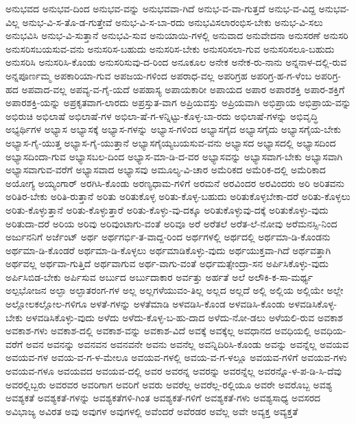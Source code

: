{ಅನುಭವದ
ಅನುಭವ-ದಿಂದ
ಅನುಭವ-ವನ್ನು
ಅನುಭವವಾ-ಗಿದೆ
ಅನುಭ-ವ-ವಾ-ಗುತ್ತದೆ
ಅನುಭ-ವ-ವಿದ್ದ
ಅನುಭವ-ವಿಲ್ಲ
ಅನುಭ-ವಿ-ಸ-ತೊ-ಡ-ಗುತ್ತೇವೆ
ಅನುಭ-ವಿ-ಸ-ಬಾ-ರದು
ಅನುಭವಿಸಲಾರಂಭಿಸ-ಬೇಕು
ಅನುಭ-ವಿ-ಸಲು
ಅನುಭವಿಸಿ
ಅನುಭ-ವಿ-ಸುತ್ತಾನೆ
ಅನುಭವಿ-ಸುವ
ಅನುಯಾಯಿ-ಗಳಲ್ಲಿ
ಅನುವಾದ
ಅನುವೇದನಾ
ಅನುಸರಣೆ
ಅನುಸರಿ
ಅನುಸರಿಸಬಯಸುವ-ವನು
ಅನುಸರಿಸ-ಬಹುದು
ಅನುಸರಿಸ-ಬೇಕು
ಅನುಸರಿಸಲಾ-ಗುವ
ಅನುಸರಿಸಲೂ-ಬಹುದು
ಅನುಸರಿಸಿ
ಅನುಸರಿಸಿ-ಕೊಂಡು
ಅನುಸರಿಸುವು-ದ-ರಿಂದ
ಅನೂಕೂಲ
ಅನೇಕ
ಅನೇಕ-ರು-ನಾನು
ಅನ್ನನಾಳ-ದಲ್ಲಿ-ರುವ
ಅನ್ನಪೂರ್ಣಮ್ಮ
ಅಪಕಾರಿಯಾ-ಗುವ
ಅಪಜಯ-ಗಳಿಂದ
ಅಪರಾಧ-ವಲ್ಲ
ಅಪರಿಗ್ರಹ
ಅಪರಿಗ್ರ-ಹ-ಗ-ಳೆಂಬ
ಅಪರಿಗ್ರ-ಹದ
ಅಪವಾದ-ವಲ್ಲ
ಅಪವ್ಯ-ವ-ಗೈ-ಯದೆ
ಅಪಹಾಸ್ಯ
ಅಪಾಯಕಾರೀ
ಅಪಾಯದ
ಅಪಾರ
ಅಪಾರಶಕ್ತಿ
ಅಪಾರ-ಶಕ್ತಿಗೆ
ಅಪಾರಶಕ್ತಿ-ಯನ್ನು
ಅಪ್ರಕೃತವಾಗ-ಲಾರದು
ಅಪ್ರಸ್ತುತ-ವಾಗ
ಅಪ್ರಿಯವಸ್ತು
ಅಪ್ರಿಯವಾಗಿ
ಅಭಿಪ್ರಾಯ
ಅಭಿಪ್ರಾಯ-ವನ್ನು
ಅಭಿರುಚಿ
ಅಭಿಲಾಷೆ
ಅಭಿಲಾಷೆ-ಗಳ
ಅಭಿಲಾ-ಷೆ-ಗ-ಳನ್ನಿಟ್ಟು-ಕೊಳ್ಳ-ಬಾ-ರದು
ಅಭಿಲಾಷೆ-ಗಳನ್ನು
ಅಭಿವೃದ್ಧಿ
ಅಭ್ಯರ್ಥಿಗಳ
ಅಭ್ಯಾಸ
ಅಭ್ಯಾಸಕ್ಕೆ
ಅಭ್ಯಾಸ-ಗಳನ್ನು
ಅಭ್ಯಾಸ-ಗಳಿಂದ
ಅಭ್ಯಾಸಗೈದ
ಅಭ್ಯಾಸಗೈದು
ಅಭ್ಯಾಸಗೈಯ-ಬೇಕು
ಅಭ್ಯಾಸ-ಗೈ-ಯುತ್ತ
ಅಭ್ಯಾಸ-ಗೈ-ಯುತ್ತಾನೆ
ಅಭ್ಯಾಸಗೈಯ್ಯಬಯಸುವ-ವನು
ಅಭ್ಯಾಸದ
ಅಭ್ಯಾಸದಲ್ಲಿ
ಅಭ್ಯಾಸದಿಂದ
ಅಭ್ಯಾಸದಿಂದಾ-ಗುವ
ಅಭ್ಯಾಸಬಲ-ದಿಂದ
ಅಭ್ಯಾಸ-ಮಾ-ಡಿ-ದ-ವರ
ಅಭ್ಯಾಸವನ್ನು
ಅಭ್ಯಾಸವಾಗ-ಬೇಕು
ಅಭ್ಯಾಸವಾಗಿ
ಅಭ್ಯಾಸವಾಗುವ-ವರೆಗೆ
ಅಭ್ಯಾಸವಾದ
ಅಭ್ಯಾಸವು
ಅಮೂಲ್ಯ-ವಿ-ಚಾರ
ಅಮೆರಿಕದ
ಅಮೆರಿಕ-ದಲ್ಲಿ
ಅಮೆರಿಕಾದ
ಅಯೋಗ್ಯ
ಅಯ್ಯಂಗಾರ್
ಅರಗಿಸಿ-ಕೊಂಡು
ಅರಣ್ಯಧಾಮ-ಗಳಿಗೆ
ಅರಮನೆ
ಅರವಿಂದರ
ಅರವಿಂದರು
ಅರಿ
ಅರಿತವನು
ಅರಿತಿರ-ಬೇಕು
ಅರಿತಿ-ರುತ್ತಾನೆ
ಅರಿತು
ಅರಿತುಕೊಳ್ಳ
ಅರಿತು-ಕೊಳ್ಳ-ಬಹುದು
ಅರಿತುಕೊಳ್ಳಬೇಕಾ-ದರೆ
ಅರಿತು-ಕೊಳ್ಳಲು
ಅರಿತು-ಕೊಳ್ಳುತ್ತಾನೆ
ಅರಿತು-ಕೊಳ್ಳುತ್ತಾರೆ
ಅರಿತು-ಕೊಳ್ಳು-ವು-ದಕ್ಕೂ
ಅರಿತುಕೊಳ್ಳುವು-ದಕ್ಕೆ
ಅರಿತುಕೊಳ್ಳು-ವುದು
ಅರಿತುದಾ-ದರೆ
ಅರಿಯ
ಅರಿವು
ಅರಿವುಂಟಾಗು-ವಂತೆ
ಅರಿವೂ
ಅರೆ
ಅರೆತಲೆ
ಅರೆತ-ಲೆ-ನೋವು
ಅರೆಮನಸ್ಸಿ-ನಿಂದ
ಅರ್ಜುನನಿಗೆ
ಅರ್ಜೆಂಟ್
ಅರ್ಥ
ಅರ್ಥಗರ್ಭಿ-ತ-ವಾದ್ದ-ರಿಂದ
ಅರ್ಥಗಳಲ್ಲಿ
ಅರ್ಥದಲ್ಲಿ
ಅರ್ಥಮಾ-ಡಿ-ಕೊಂಡನು
ಅರ್ಥಮಾ-ಡಿ-ಕೊಂಡರೆ
ಅರ್ಥಮಾ-ಡಿ-ಕೊಳ್ಳಲು
ಅರ್ಥಮಾಡಿಕೊಳ್ಳು-ವುದು
ಅರ್ಥಯುಕ್ತವಾ-ಗಿದೆ
ಅರ್ಥವತ್ತಾಗಿ
ಅರ್ಥವಲ್ಲ
ಅರ್ಥವಾ-ಗುತ್ತಿದೆ
ಅರ್ಥವಾಗುವ
ಅರ್ಥ-ವಾಗು-ವಂತೆ
ಅರ್ಧಮತ್ಸೇಂದ್ರಾ-ಸನ
ಅರ್ಪಿಸಿಕೊಳ್ಳು-ವುದು
ಅರ್ಪಿಸಿಬಿಡ-ಬೇಕು
ಅರ್ಪಿಸುವ
ಅರ್ಬುದ
ಅರ್ಬುದಾಕಾರ
ಅರ್ವತ್ತು
ಅರ್ಹತೆ
ಅಲೆ
ಅಲೌಕಿ-ಕ-ಸಾ-ಮರ್ಥ್ಯ
ಅಲ್ಪಭೋಜನ
ಅಲ್ಫಾ
ಅಲ್ಫಾತರಂಗ-ಗಳ
ಅಲ್ಲ
ಅಲ್ಲಗಳೆಯುವಂ-ತಿಲ್ಲ
ಅಲ್ಲದ
ಅಲ್ಲದೆ
ಅಲ್ಲಿ
ಅಲ್ಲಿಯ
ಅಲ್ಲಿಯೇ
ಅಲ್ಲೇ
ಅಲ್ಲೋಲಕಲ್ಲೋಲ-ಗಳಿಗೂ
ಅಳತೆ-ಗಳನ್ನು
ಅಳತೆಮಾಡಿ
ಅಳವಡಿಸಿ-ಕೊಂಡ
ಅಳವಡಿಸಿ-ಕೊಂಡು
ಅಳವಡಿಸಿಕೊಳ್ಳ-ಬೇಕು
ಅಳವಡಿಸಿಕೊಳ್ಳು-ವುದು
ಅಳೆದು
ಅಳೆದು-ಕೊಳ್ಳ-ಬ-ಹು-ದಾದ
ಅಳೆದು-ನೋ-ಡಲು
ಅಳೆಯಲಿ-ರುವ
ಅವಕಾಶ
ಅವಕಾಶ-ಗಳು
ಅವಕಾಶ-ದಲ್ಲಿ
ಅವಕಾಶ-ವನ್ನು
ಅವಕಾಶ-ವಿದೆ
ಅವಕ್ಕೆ
ಅವಕ್ಕೆಲ್ಲ
ಅವಧಾನದ
ಅವಧಿಯಲ್ಲಿ
ಅವಧಿಯ-ವರೆಗೆ
ಅವನ
ಅವನನ್ನು
ಅವನವನ
ಅವನವನೇ
ಅವನು
ಅವನೆಲ್ಲ
ಅವನ್ನಿದಿರಿಸಿ-ಕೊಂಡು
ಅವನ್ನು
ಅವನ್ನೆಲ್ಲ
ಅವಯವ
ಅವಯವ-ಗಳ
ಅವಯ-ವ-ಗ-ಳ-ಮೇಲೂ
ಅವಯವ-ಗಳಲ್ಲಿ
ಅವಯ-ವ-ಗ-ಳಲ್ಲೂ
ಅವಯವ-ಗಳಿಗೆ
ಅವಯವ-ಗಳು
ಅವಯವ-ಗಳೂ
ಅವಯವದ
ಅವಯವ-ದಲ್ಲಿ
ಅವರ
ಅವರನ್ನ
ಅವರನ್ನು
ಅವರನ್ನೆಲ್ಲ
ಅವರನ್ನೊ-ಳ-ಪ-ಡಿ-ಸಿ-ದೆವು
ಅವರಲ್ಲಿಬ್ಬರು
ಅವರವರ
ಅವರಿಗಾಗ
ಅವರಿಗೆ
ಅವರು
ಅವರೆಲ್ಲ
ಅವರೆಲ್ಲ-ರಲ್ಲಿಯೂ
ಅವರೇ
ಅವರೊಬ್ಬ
ಅವಶ್ಯ
ಅವಶ್ಯಕತೆ
ಅವಶ್ಯಕತೆ-ಗಳನ್ನು
ಅವಶ್ಯಕತೆಗಳಿ-ಗಿಂತ
ಅವಶ್ಯಕತೆ-ಗಳಿಗೆ
ಅವಶ್ಯಕತೆ-ಗಳು
ಅವಶ್ಯಸಾಧ್ಯ
ಅವಸರದ
ಅವಿಭಾಜ್ಯ
ಅವಿರತ
ಅವು
ಅವುಗಳ
ಅವುಗಳಲ್ಲಿ
ಅವೆಂದರೆ
ಅವೆರಡರ
ಅವೆಲ್ಲ
ಅವೇ
ಅವ್ಯಕ್ತ
ಅವ್ಯಕ್ತತೆ
}
